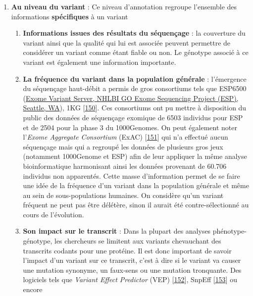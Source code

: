 \documentclass[12pt,a4paper,twoside]{ugathesis}
\providecommand{\tightlist}{%
  \setlength{\itemsep}{0pt}\setlength{\parskip}{0pt}}
\theoremstyle{definition}
\theoremstyle{definition}
\theoremstyle{definition}
\theoremstyle{remark}
\begin{document}
\begin{enumerate}
\def\labelenumi{\arabic{enumi}.}
\tightlist
\item
  \textbf{Au niveau du variant} : Ce niveau d'annotation regroupe
  l'ensemble des informations \textbf{spécifiques} à un variant

  \begin{enumerate}
  \def\labelenumii{\alph{enumii}.}
  \item
    \textbf{Informations issues des résultats du séquençage} : la
    couverture du variant ainsi que la qualité qui lui est associée
    peuvent permettre de considérer un variant comme étant fiable ou
    non. Le génotype associé à ce variant est également une information
    importante.
  \item
    \textbf{La fréquence du variant dans la population générale} :
    l'émergence du séquençage haut-débit a permis de gros consortiums
    tels que ESP6500 (\href{http://evs.gs.washington.edu/EVS/}{Exome
    Variant Server, NHLBI GO Exome Sequencing Project (ESP), Seattle,
    WA}), 1KG
    {[}\protect\hyperlink{ref-1000GenomesProjectConsortium2015}{150}{]}.
    Ces consortiums ont pu mettre à disposition du public des données de
    séquençage exomique de 6503 individus pour ESP et de 2504 pour la
    phase 3 du 1000Genomes. On peut également noter l'\emph{Exome
    Aggregate Consortium} (ExAC)
    {[}\protect\hyperlink{ref-Lek2016}{151}{]} qui n'a effectué aucun
    séquençage mais qui a regroupé les données de plusieurs gros jeux
    (notamment 1000Genome et ESP) afin de leur appliquer la même analyse
    bioinformatique harmonisant ainsi les données provenant de 60.706
    individus non apparentés. Cette masse d'information permet de se
    faire une idée de la fréquence d'un variant dans la population
    générale et même au sein de sous-populations humaines. On considère
    qu'un variant fréquent ne peut pas être délétère, sinon il aurait
    été contre-sélectionné au cours de l'évolution.
  \item
    \textbf{Son impact sur le transcrit} : Dans la plupart des analyses
    phénotype-génotype, les chercheurs se limitent aux variants
    chevauchant des transcrits codants pour une protéine. Il est donc
    important de savoir l'impact d'un variant sur ce transcrit, c'est à
    dire si le variant va causer une mutation synonyme, un faux-sens ou
    une mutation tronquante. Des logiciels tels que \emph{Variant Effect
    Predictor} (VEP) {[}\protect\hyperlink{ref-McLaren2016}{152}{]},
    SnpEff {[}\protect\hyperlink{ref-Cingolani2012}{153}{]} ou encore

\end{enumerate}
\end{enumerate}
\end{document}
